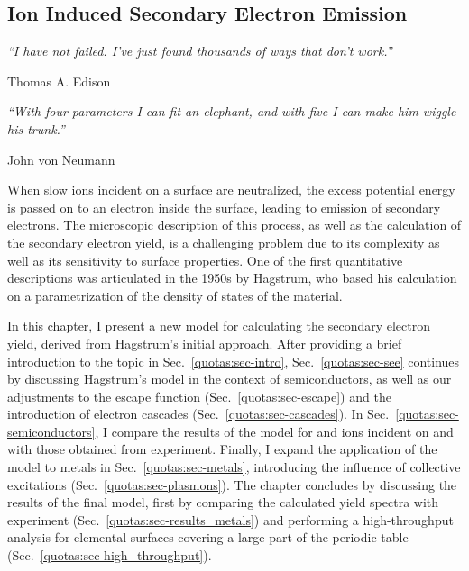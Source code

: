 \begin{refsection} 
 
\chapter{Ion Induced Secondary Electron Emission} \label{chapter:quotas} 
 
\setlength{\epigraphwidth}{4in} 
\epigraph{\textit{``I have not failed. I've just found thousands of ways that don't 
work.''}}{Thomas A. Edison} 
 
\setlength{\epigraphwidth}{4in} 
\epigraph{\textit{``With four parameters I can fit an elephant, and with five 
I can make him wiggle his trunk.''}}{John von Neumann} 
 
\vspace{2em} 
 
When slow ions incident on a surface are neutralized, the excess potential 
energy is passed on to an electron inside the surface, leading to emission of 
secondary electrons. The microscopic description of this process, as well as 
the calculation of the secondary electron yield, is a challenging problem due 
to its complexity as well as its sensitivity to surface properties. One of the 
first quantitative descriptions was articulated in the 1950s by Hagstrum, who 
based his calculation on a parametrization of the density of states of the 
material.  
 
In this chapter, I present a new model for calculating the secondary electron 
yield, derived from Hagstrum's initial approach. After providing a brief 
introduction to the topic in Sec.~\ref{quotas:sec-intro}, 
Sec.~\ref{quotas:sec-see} continues by discussing Hagstrum's model in the 
context of semiconductors, as well as our adjustments to the escape function 
(Sec.~\ref{quotas:sec-escape}) and the introduction of electron cascades 
(Sec.~\ref{quotas:sec-cascades}). In Sec.~\ref{quotas:sec-semiconductors}, I 
compare the results of the model for  and  ions incident on 
 and  with those obtained from experiment. Finally, I 
expand the application of the model to metals in Sec.~\ref{quotas:sec-metals}, 
introducing the influence of collective excitations 
(Sec.~\ref{quotas:sec-plasmons}). The chapter concludes by discussing the 
results of the final model, first by comparing the calculated yield spectra 
with experiment (Sec.~\ref{quotas:sec-results_metals}) and performing a 
high-throughput analysis for elemental surfaces covering a large part of the 
periodic table (Sec.~\ref{quotas:sec-high_throughput}).


\end{refsection}
